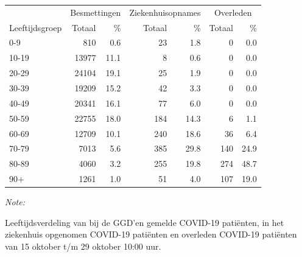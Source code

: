 \documentclass[
  english,
  man,floatsintext]{apa6}
\begin{document}
\begin{table}[H]
\centering\begingroup\fontsize{11}{13}\selectfont

\begin{threeparttable}
\begin{tabular}{lrrrrrr}
\toprule
\multicolumn{1}{c}{ } & \multicolumn{2}{c}{Besmettingen} & \multicolumn{2}{c}{Ziekenhuisopnames} & \multicolumn{2}{c}{Overleden} \\
\cmidrule(l{3pt}r{3pt}){2-3} \cmidrule(l{3pt}r{3pt}){4-5} \cmidrule(l{3pt}r{3pt}){6-7}
Leeftijdsgroep & Totaal & \% & Totaal & \% & Totaal & \%\\
\midrule
0-9 & 810 & 0.6 & 23 & 1.8 & 0 & 0.0\\
10-19 & 13977 & 11.1 & 8 & 0.6 & 0 & 0.0\\
20-29 & 24104 & 19.1 & 25 & 1.9 & 0 & 0.0\\
30-39 & 19209 & 15.2 & 42 & 3.3 & 0 & 0.0\\
40-49 & 20341 & 16.1 & 77 & 6.0 & 0 & 0.0\\
50-59 & 22755 & 18.0 & 184 & 14.3 & 6 & 1.1\\
60-69 & 12709 & 10.1 & 240 & 18.6 & 36 & 6.4\\
70-79 & 7013 & 5.6 & 385 & 29.8 & 140 & 24.9\\
80-89 & 4060 & 3.2 & 255 & 19.8 & 274 & 48.7\\
90+ & 1261 & 1.0 & 51 & 4.0 & 107 & 19.0\\
\bottomrule
\end{tabular}
\begin{tablenotes}
\item \textit{Note: } 
\item Leeftijdsverdeling van bij de GGD’en gemelde COVID-19 patiënten, in het ziekenhuis opgenomen COVID-19 patiënten en overleden COVID-19 patiënten van 15 oktober t/m 29 oktober 10:00 uur.
\end{tablenotes}
\end{threeparttable}
\endgroup{}
\end{table}
\end{document}
